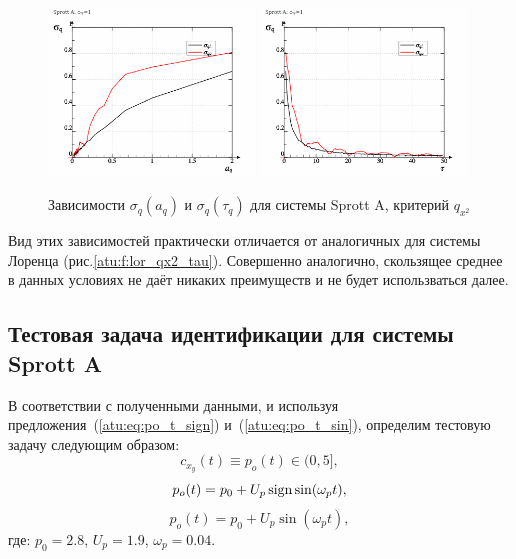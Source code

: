\begin{figure}[h!]
\begin{center}
  \includegraphics[width=0.49\textwidth]{p/cha/spr_a/sprott_a_qx2_tau-p_aq_sd.png}
  \hfill
  \includegraphics[width=0.49\textwidth]{p/cha/spr_a/sprott_a_qx2_tau-p_tau_sd.png}
\end{center}
  \caption{Зависимости $\sigma_{q}(a_q)$ и $\sigma_{q}(\tau_q)$ для системы Sprott A, критерий  $q_{x^2}$}
\label{atu:f:spr_a_qx2_tau}
\end{figure}

Вид этих зависимостей практически отличается от аналогичных для системы Лоренца (рис.\ref{atu:f:lor_qx2_tau}).
Совершенно аналогично, скользящее среднее в данных условиях
не даёт никаких преимуществ и не будет использваться далее.



\subsection{Тестовая задача идентификации для системы Sprott A}

В соответствии с полученными данными, и используя
предложения~(\ref{atu:eq:po_t_sign}) и~(\ref{atu:eq:po_t_sin}),
определим тестовую задачу следующим образом:
\[
  c_{x_y}(t) \equiv p_o(t) \in (0, 5],
\]
%
\begin{equation}
  p_o(t) = p_0 +  U_{p} \operatorname*{sign} \sin( \omega_{p} t ),
  \label{atu:eq:spr_a_po_t_sign}
\end{equation}
%
%
\begin{equation}
  p_o(t) = p_0 +  U_{p} \sin( \omega_{p} t ),
  \label{atu:eq:spr_a_po_t_sin}
\end{equation}
%
где:
$p_0 = 2.8$, $U_p=1.9$, $\omega_p=0.04$.

